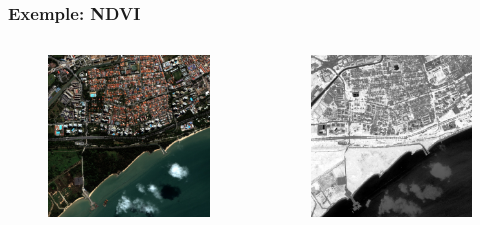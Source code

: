 \documentclass[compress,handout]{beamer}
\begin{document}
\begin{frame}
\frametitle{Exemple: NDVI}
\begin{columns}
\begin{column}{0.5\textwidth}
\begin{figure}[]
  \includegraphics[width=1.0\textwidth]{radio2-extract-3b.jpg}
\end{figure}
\end{column}
\begin{column}{0.5\textwidth}
\begin{figure}[]
  \includegraphics[width=1.0\textwidth]{Radiometry-NDVI.jpg}
\end{figure}
\end{column}
\end{columns}
\end{frame}
\end{document}
